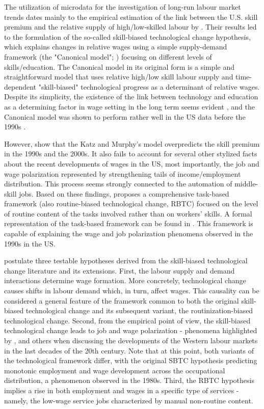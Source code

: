 \documentclass[11pt]{article}
\begin{document}
The utilization of microdata for the investigation of long-run labour market trends dates mainly to the empirical estimation of the link between the U.S. skill premium and the relative supply of high/low-skilled labour by \citet{katz1992changes}. Their results led to the formulation of the so-called skill-biased technological change hypothesis, which explains changes in relative wages using a simple supply-demand framework (the "Canonical model"; \citealt{acemoglu2012does}) focusing on different levels of skills/education. The Canonical model in its original form is a simple and straightforward model that uses relative high/low skill labour supply and time-dependent "skill-biased" technological progress as a determinant of relative wages. Despite its simplicity, the existence of the link between technology and education as a determining factor in wage setting in the long term seems evident \citep{piketty2018capital}, and the Canonical model was shown to perform rather well in the US data before the 1990s \citep{katz1992changes}.

However, \citet{acemoglu2011skills} show that the Katz and Murphy's model overpredicts the skill premium in the 1990s and the 2000s. It also fails to account for several other stylized facts about the recent developments of wages in the US, most importantly, the job and wage polarization represented by strengthening tails of income/employment distribution. This process seems strongly connected to the automation of middle-skill jobs. Based on these findings, \citet{acemoglu2012does} proposes a comprehensive task-based framework (also routine-biased technological change, RBTC) focused on the level of routine content of the tasks involved rather than on workers' skills. A formal representation of the task-based framework can be found in \citet{acemoglu2011skills}. This framework is capable of explaining the wage and job polarization phenomena observed in the 1990s in the US.

\citet{mishel2013assessing} postulate three testable hypotheses derived from the skill-biased technological change literature and its extensions. First, the labour supply and demand interactions determine wage formation. More concretely, technological change causes shifts in labour demand which, in turn, affect wages. This causality can be considered a general feature of the framework common to both the original skill-biased technological change and its subsequent variant, the routinization-biased technological change. Second, from the empirical point of view, the skill-biased technological change leads to job and wage polarization - phenomena highlighted by \citet{acemoglu2012does}, \citet{howell2019declining} and others when discussing the developments of the Western labour markets in the last decades of the 20th century. Note that at this point, both variants of the technological framework differ, with the original SBTC hypothesis predicting monotonic employment and wage development across the occupational distribution, a phenomenon observed in the 1980s. Third, the RBTC hypothesis implies a rise in both employment and wages in a specific type of services - namely, the low-wage service jobs characterized by manual non-routine content.
\end{document}
